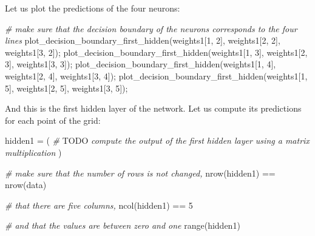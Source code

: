 \documentclass[
]{article}
\newenvironment{Shaded}{\begin{snugshade}}{\end{snugshade}}
\newcommand{\AlertTok}[1]{\textcolor[rgb]{0.94,0.16,0.16}{#1}}
\newcommand{\CommentTok}[1]{\textcolor[rgb]{0.56,0.35,0.01}{\textit{#1}}}
\newcommand{\DecValTok}[1]{\textcolor[rgb]{0.00,0.00,0.81}{#1}}
\newcommand{\FunctionTok}[1]{\textcolor[rgb]{0.00,0.00,0.00}{#1}}
\newcommand{\NormalTok}[1]{#1}
\newcommand{\OtherTok}[1]{\textcolor[rgb]{0.56,0.35,0.01}{#1}}
\newcommand{\SpecialCharTok}[1]{\textcolor[rgb]{0.00,0.00,0.00}{#1}}
\begin{document}
Let us plot the predictions of the four neurons:

\begin{Shaded}
\begin{Highlighting}[]
\CommentTok{\# make sure that the decision boundary of the neurons corresponds to the four lines}
\FunctionTok{plot\_decision\_boundary\_first\_hidden}\NormalTok{(weights1[}\DecValTok{1}\NormalTok{, }\DecValTok{2}\NormalTok{], weights1[}\DecValTok{2}\NormalTok{, }\DecValTok{2}\NormalTok{], weights1[}\DecValTok{3}\NormalTok{, }\DecValTok{2}\NormalTok{]);}
\FunctionTok{plot\_decision\_boundary\_first\_hidden}\NormalTok{(weights1[}\DecValTok{1}\NormalTok{, }\DecValTok{3}\NormalTok{], weights1[}\DecValTok{2}\NormalTok{, }\DecValTok{3}\NormalTok{], weights1[}\DecValTok{3}\NormalTok{, }\DecValTok{3}\NormalTok{]);}
\FunctionTok{plot\_decision\_boundary\_first\_hidden}\NormalTok{(weights1[}\DecValTok{1}\NormalTok{, }\DecValTok{4}\NormalTok{], weights1[}\DecValTok{2}\NormalTok{, }\DecValTok{4}\NormalTok{], weights1[}\DecValTok{3}\NormalTok{, }\DecValTok{4}\NormalTok{]);}
\FunctionTok{plot\_decision\_boundary\_first\_hidden}\NormalTok{(weights1[}\DecValTok{1}\NormalTok{, }\DecValTok{5}\NormalTok{], weights1[}\DecValTok{2}\NormalTok{, }\DecValTok{5}\NormalTok{], weights1[}\DecValTok{3}\NormalTok{, }\DecValTok{5}\NormalTok{]);}
\end{Highlighting}
\end{Shaded}

And this is the first hidden layer of the network. Let us compute its
predictions for each point of the grid:

\begin{Shaded}
\begin{Highlighting}[]
\NormalTok{hidden1 }\OtherTok{=}\NormalTok{ (}
  \CommentTok{\# }\AlertTok{TODO}\CommentTok{ compute the output of the first hidden layer using a matrix multiplication}
\NormalTok{)}

\CommentTok{\# make sure that the number of rows is not changed,}
\FunctionTok{nrow}\NormalTok{(hidden1) }\SpecialCharTok{==} \FunctionTok{nrow}\NormalTok{(data)}

\CommentTok{\# that there are five columns,}
\FunctionTok{ncol}\NormalTok{(hidden1) }\SpecialCharTok{==} \DecValTok{5}

\CommentTok{\# and that the values are between zero and one}
\FunctionTok{range}\NormalTok{(hidden1)}
\end{Highlighting}
\end{Shaded}
\end{document}
